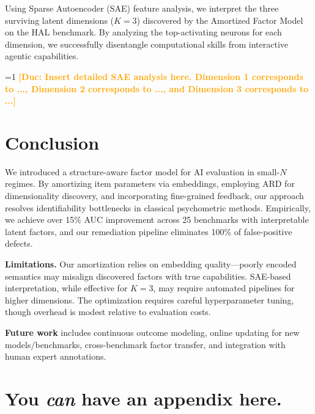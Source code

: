\documentclass{article}
\theoremstyle{plain}
\theoremstyle{definition}
\theoremstyle{remark}
\newcommand{\showcomments}{1} %
\newcommand{\authcomment}[3]{%
\ifnum\showcomments=1
  {\textcolor{#2}{\textbf{[#1: #3]}}}%
\fi}
\newcommand{\md}[1]{\authcomment{Duc}{orange}{#1}}
\begin{document}
Using Sparse Autoencoder (SAE) feature analysis, we interpret the three surviving latent dimensions ($K=3$) discovered by the Amortized Factor Model on the HAL benchmark. By analyzing the top-activating neurons for each dimension, we successfully disentangle computational skills from interactive agentic capabilities.

\md{Insert detailed SAE analysis here. Dimension 1 corresponds to ..., Dimension 2 corresponds to ..., and Dimension 3 corresponds to ...}


\section{Conclusion}
\label{sec:discussion}

We introduced a structure-aware factor model for AI evaluation in small-$N$ regimes. By amortizing item parameters via embeddings, employing ARD for dimensionality discovery, and incorporating fine-grained feedback, our approach resolves identifiability bottlenecks in classical psychometric methods. Empirically, we achieve over 15\% AUC improvement across 25 benchmarks with interpretable latent factors, and our remediation pipeline eliminates 100\% of false-positive defects.

\textbf{Limitations.} Our amortization relies on embedding quality---poorly encoded semantics may misalign discovered factors with true capabilities. SAE-based interpretation, while effective for $K=3$, may require automated pipelines for higher dimensions. The optimization requires careful hyperparameter tuning, though overhead is modest relative to evaluation costs.

\textbf{Future work} includes continuous outcome modeling, online updating for new models/benchmarks, cross-benchmark factor transfer, and integration with human expert annotations.




\newpage
\appendix
\onecolumn
\section{You \emph{can} have an appendix here.}
\end{document}
